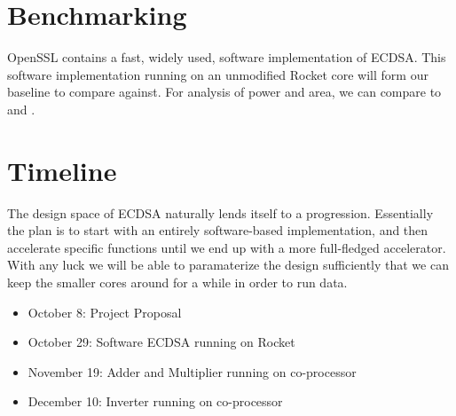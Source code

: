 \documentclass[twocolumn]{article}
\begin{document}
\section{Benchmarking}

OpenSSL contains a fast, widely used, software implementation of
ECDSA\cite{kasper-openssl_ecc}.  This software implementation running
on an unmodified Rocket core will form our baseline to compare
against. For analysis of power and area, we can compare to \cite{mmm-hw_ecc} 
and \cite{nnll-ecdsa_hw}. 

\section{Timeline}

The design space of ECDSA naturally lends itself to a progression.
Essentially the plan is to start with an entirely software-based
implementation, and then accelerate specific functions until we end up
with a more full-fledged accelerator.  With any luck we will be able
to paramaterize the design sufficiently that we can keep the smaller
cores around for a while in order to run data.

\begin{itemize}
\item October 8: Project Proposal
\item October 29: Software ECDSA running on Rocket
\item November 19: Adder and Multiplier running on co-processor
\item December 10: Inverter running on co-processor
\end{itemize}



\end{document}
